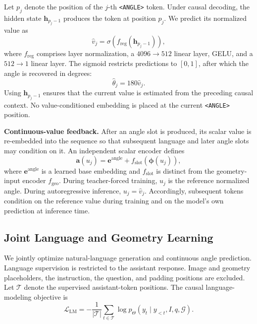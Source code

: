 \documentclass[conference]{IEEEtran}
\begin{document}
Let $p_j$ denote the position of the $j$-th \texttt{<ANGLE>} token.
Under causal decoding, the hidden state $\mathbf{h}_{p_j-1}$ produces the token at position $p_j$.
We predict its normalized value as
\begin{equation}
    \widehat{v}_j
    =\sigma\!\left(
        f_{\mathrm{reg}}(\mathbf{h}_{p_j-1})
    \right),
    \label{eq:angle_regression}
\end{equation}
where $f_{\mathrm{reg}}$ comprises layer normalization, a $4096\!\rightarrow\!512$ linear layer, GELU, and a $512\!\rightarrow\!1$ linear layer.
The sigmoid restricts predictions to $[0,1]$, after which the angle is recovered in degrees:
\begin{equation}
    \widehat{\theta}_j=180\widehat{v}_j.
    \label{eq:angle_denormalization}
\end{equation}
Using $\mathbf{h}_{p_j-1}$ ensures that the current value is estimated from the preceding causal context.
No value-conditioned embedding is placed at the current \texttt{<ANGLE>} position.

\noindent\textbf{Continuous-value feedback.}
After an angle slot is produced, its scalar value is re-embedded into the sequence so that subsequent language and later angle slots may condition on it.
An independent scalar encoder defines
\begin{equation}
    \mathbf{a}(u_j)
    =\mathbf{e}^{\mathrm{angle}}
    +f_{\mathrm{slot}}\!\left(\boldsymbol{\phi}(u_j)\right),
    \label{eq:angle_feedback}
\end{equation}
where $\mathbf{e}^{\mathrm{angle}}$ is a learned base embedding and $f_{\mathrm{slot}}$ is distinct from the geometry-input encoder $f_{\mathrm{geo}}$.
During teacher-forced training, $u_j$ is the reference normalized angle.
During autoregressive inference, $u_j=\widehat{v}_j$.
Accordingly, subsequent tokens condition on the reference value during training and on the model's own prediction at inference time.

\subsection{Joint Language and Geometry Learning}
\label{sec:training_objective}

We jointly optimize natural-language generation and continuous angle prediction.
Language supervision is restricted to the assistant response.
Image and geometry placeholders, the instruction, the question, and padding positions are excluded.
Let $\mathcal{T}$ denote the supervised assistant-token positions.
The causal language-modeling objective is
\begin{equation}
    \mathcal{L}_{\mathrm{LM}}
    =-\frac{1}{|\mathcal{T}|}
    \sum_{t\in\mathcal{T}}
    \log p_{\Theta}\!\left(
        y_t\mid y_{<t},I,q,\mathcal{G}
    \right).
    \label{eq:language_loss}
\end{equation}
\end{document}
